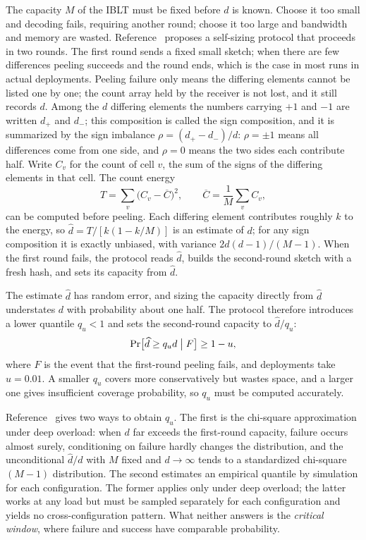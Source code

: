The capacity $M$ of the IBLT must be fixed before $d$ is known. Choose it too small and decoding fails, requiring another round; choose it too large and bandwidth and memory are wasted. Reference~\cite{prior}
proposes a self-sizing protocol that proceeds in two rounds. The first round sends a fixed small sketch; when there are few differences peeling succeeds and the round ends,
which is the case in most runs in actual deployments. Peeling failure only means the differing elements cannot be listed one by one; the count array held by the receiver is not lost, and it still records $d$.
Among the $d$ differing elements the numbers carrying $+1$ and $-1$ are written $d_+$ and $d_-$; this composition is called the sign composition, and it is summarized by the
sign imbalance $\rho=(d_+-d_-)/d$: $\rho=\pm1$ means all differences come from one side, and $\rho=0$ means the two sides each contribute half. Write $C_v$ for the count of cell $v$, the sum of the signs of the differing elements in that cell. The count energy
\begin{equation*}
T=\sum_{v}\bigl(C_v-\overline C\bigr)^2,\qquad \overline C=\frac1M\sum_vC_v,
\end{equation*}
can be computed before peeling. Each differing element contributes roughly $k$ to the energy, so $\widehat d=T/[k(1-k/M)]$ is an estimate of $d$;
for any sign composition it is exactly unbiased, with variance $2d(d-1)/(M-1)$. When the first round fails, the protocol reads
$\widehat d$, builds the second-round sketch with a fresh hash, and sets its capacity from $\widehat d$.

The estimate $\widehat d$ has random error, and sizing the capacity directly from $\widehat d$ understates $d$ with probability about one half. The protocol therefore introduces a lower
quantile $q_u<1$ and sets the second-round capacity to $\widehat d/q_u$:
\begin{equation*}
\Pr\bigl[\widehat d\ge q_u d\bigm| F\bigr]\ge1-u,
\end{equation*}
where $F$ is the event that the first-round peeling fails, and deployments take $u=0.01$. A smaller $q_u$ covers more conservatively but wastes space, and a larger one gives insufficient coverage probability,
so $q_u$ must be computed accurately.

Reference~\cite{prior} gives two ways to obtain $q_u$. The first is the chi-square approximation under deep overload:
when $d$ far exceeds the first-round capacity, failure occurs almost surely, conditioning on failure hardly changes the distribution, and the unconditional $\widehat d/d$ with $M$ fixed and
$d\to\infty$ tends to a standardized chi-square $(M-1)$ distribution. The second estimates an empirical
quantile by simulation for each configuration. The former applies only under deep overload; the latter works at any load but must be sampled separately for each configuration and yields no cross-configuration pattern.
What neither answers is the \emph{critical window}\cite{dm}, where failure and success have comparable probability.

